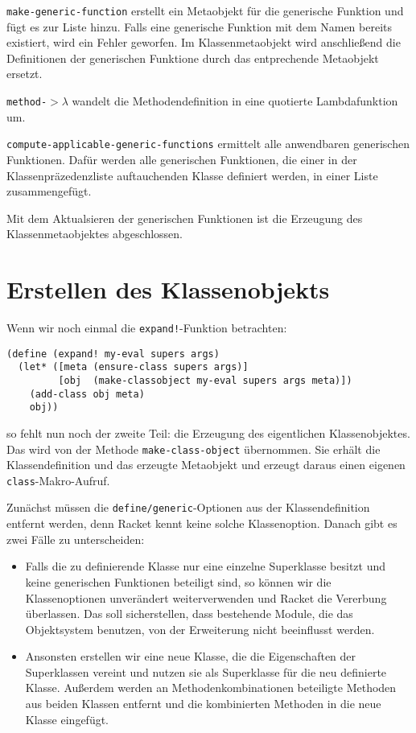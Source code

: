 \texttt{make-generic-function} erstellt ein Metaobjekt für die generische Funktion und fügt es zur Liste hinzu. Falls eine generische Funktion mit dem Namen bereits existiert, wird ein Fehler geworfen. Im Klassenmetaobjekt wird anschließend die Definitionen der generischen Funktione durch das entprechende Metaobjekt ersetzt.

\texttt{method-$>\lambda$} wandelt die Methodendefinition in eine quotierte Lambdafunktion um.

\texttt{compute-applicable-generic-functions} ermittelt alle anwendbaren generischen Funktionen. Dafür werden alle generischen Funktionen, die einer in der Klassenpräzedenzliste auftauchenden Klasse definiert werden, in einer Liste zusammengefügt.

Mit dem Aktualsieren der generischen Funktionen ist die Erzeugung des Klassenmetaobjektes abgeschlossen.

\section{Erstellen des Klassenobjekts}

Wenn wir noch einmal die \texttt{expand!}-Funktion betrachten:

\begin{lstlisting}
(define (expand! my-eval supers args)
  (let* ([meta (ensure-class supers args)]
         [obj  (make-classobject my-eval supers args meta)])
    (add-class obj meta)
    obj))
\end{lstlisting}

so fehlt nun noch der zweite Teil: die Erzeugung des eigentlichen Klassenobjektes. Das wird von der Methode \texttt{make-class-object} übernommen. Sie erhält die Klassendefinition und das erzeugte Metaobjekt und erzeugt daraus einen eigenen \texttt{class}-Makro-Aufruf.

Zunächst müssen die \texttt{define/generic}-Optionen aus der Klassendefinition entfernt werden, denn Racket kennt keine solche Klassenoption. Danach gibt es zwei Fälle zu unterscheiden:
\begin{itemize}
 \item Falls die zu definierende Klasse nur eine einzelne Superklasse besitzt und keine generischen Funktionen beteiligt sind, so können wir die Klassenoptionen unverändert weiterverwenden und Racket die Vererbung überlassen. Das soll sicherstellen, dass bestehende Module, die das Objektsystem benutzen, von der Erweiterung nicht beeinflusst werden.
 \item Ansonsten erstellen wir eine neue Klasse, die die Eigenschaften der Superklassen vereint und nutzen sie als Superklasse für die neu definierte Klasse. Außerdem werden an  Methodenkombinationen beteiligte Methoden aus beiden Klassen entfernt und die kombinierten Methoden in die neue Klasse eingefügt.
\end{itemize}

